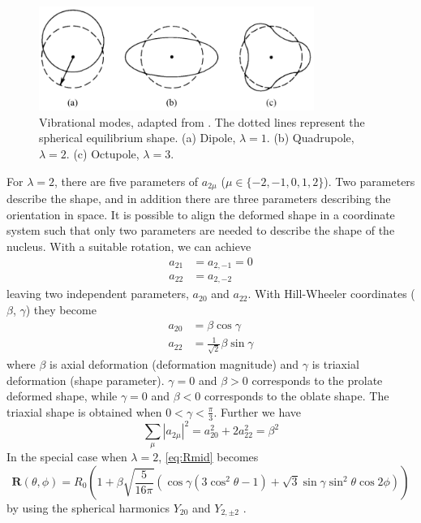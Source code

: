 \documentclass[twoside,english]{uiofysmaster/uiofysmaster}
\let\orgautoref\autoref
\renewcommand{\autoref}
        {%
		 \def\sectionautorefname{Section}%
		 \def\subsectionautorefname{Section}%
		 \def\subsubsectionautorefname{Section}%
		 \def\chapterautorefname{Chapter}%
          \orgautoref}
\begin{document}
\begin{figure}[ht]
	\centering
	\includegraphics[width=0.8\textwidth]{Images/vibration-modes-3.png}
	\caption{Vibrational modes, adapted from \cite{Krane}. The dotted lines represent the spherical equilibrium shape.
	(a) Dipole, $\lambda = 1$. 
	(b) Quadrupole, $\lambda = 2$. 
	(c) Octupole, $\lambda = 3$.}
	\label{fig:vibrational-modes}
\end{figure}

For $\lambda = 2$, there are five parameters of $a_{2\mu}$ ($\mu \in \{ -2, -1, 0, 1, 2 \}$). 
Two parameters describe the shape, and in addition there are three parameters describing the orientation in space. %
It is possible to align the deformed shape in a coordinate system such that only two parameters are needed to describe the shape of the nucleus.
With a suitable rotation, we can achieve 
\begin{align*}
	a_{21} &=  a_{2,-1} = 0 \\
	a_{22} &= a_{2,-2} 
\end{align*}
leaving two independent parameters, $a_{20}$ and $a_{22}$. 
With Hill-Wheeler \cite{Hill-Wheeler} coordinates ($\beta$, $\gamma$) they become
\begin{align}
	a_{20} &= \beta \cos \gamma \label{eq:a-param1} \\
	a_{22} &= \frac{1}{\sqrt{2}} \beta \sin \gamma \label{eq:a-param2}
\end{align}
where $\beta$ is axial deformation (deformation magnitude) and $\gamma$ is triaxial deformation (shape parameter). 
$\gamma = 0$ and $\beta > 0$ corresponds to  the prolate deformed shape, while $\gamma = 0$ and $\beta < 0$ corresponds to the oblate shape. 
The triaxial shape is obtained when $0 < \gamma < \tfrac{\pi}{3}$.
Further we have
\begin{equation}
	\sum_\mu | a_{2\mu} |^2 = a_{20}^2 + 2a_{22}^2 = \beta^2
\end{equation}
In the special case when $\lambda = 2$, \autoref{eq:Rmid} becomes
\begin{equation}
	\mathbf{R}(\theta, \phi) = R_0 \left( 1 + \beta \sqrt{\frac{5}{16\pi}} (\cos \gamma (3\cos^2 \theta - 1) + \sqrt{3} \sin \gamma \sin^2 \theta \cos 2\phi) \right)
\end{equation}
by using the spherical harmonics $Y_{20}$ and $Y_{2,\pm 2}$ \cite{RS}.
\end{document}

